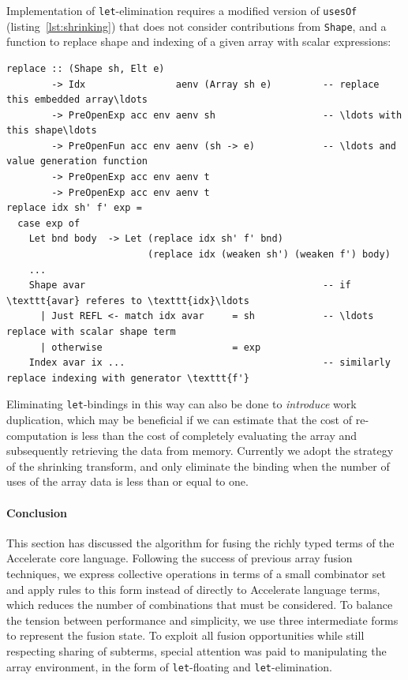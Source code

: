 Implementation of \texttt{let}-elimination requires a modified version of
\texttt{usesOf} (listing~\ref{lst:shrinking}) that does not consider
contributions from \texttt{Shape}, and a function to replace shape and indexing
of a given array with scalar expressions:
%
\begin{lstlisting}[style=haskell]
replace :: (Shape sh, Elt e)
        -> Idx                aenv (Array sh e)         -- replace this embedded array\ldots
        -> PreOpenExp acc env aenv sh                   -- \ldots with this shape\ldots
        -> PreOpenFun acc env aenv (sh -> e)            -- \ldots and value generation function
        -> PreOpenExp acc env aenv t
        -> PreOpenExp acc env aenv t
replace idx sh' f' exp =
  case exp of
    Let bnd body  -> Let (replace idx sh' f' bnd)
                         (replace idx (weaken sh') (weaken f') body)
    ...
    Shape avar                                          -- if \texttt{avar} referes to \texttt{idx}\ldots
      | Just REFL <- match idx avar     = sh            -- \ldots replace with scalar shape term
      | otherwise                       = exp
    Index avar ix ...                                   -- similarly replace indexing with generator \texttt{f'}
\end{lstlisting}

Eliminating \texttt{let}-bindings in this way can also be done to
\emph{introduce} work duplication, which may be beneficial if we can estimate
that the cost of re-computation is less than the cost of completely evaluating
the array and subsequently retrieving the data from memory. Currently we adopt
the strategy of the shrinking transform, and only eliminate the binding when the
number of uses of the array data is less than or equal to one.


\paragraph{Conclusion}

This section has discussed the algorithm for fusing the richly typed terms of
the Accelerate core language. Following the success of previous array fusion
techniques, we express collective operations in terms of a small combinator set
and apply rules to this form instead of directly to Accelerate language terms,
which reduces the number of combinations that must be considered. To balance the
tension between performance and simplicity, we use three intermediate forms to
represent the fusion state.
%
To exploit all fusion opportunities while still respecting sharing of subterms,
special attention was paid to manipulating the array environment, in the form of
\texttt{let}-floating
and \texttt{let}-elimination.


